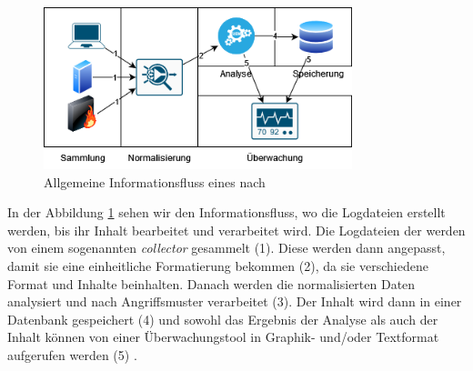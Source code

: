 \begin{figure}[H]
   \centering
   \includegraphics[width=0.8\textwidth]{assets/InfoFluss_SIEM.png}
   \caption[Allgemeine Informationsfluss von \gls{SIEM}]
   {Allgemeine Informationsfluss eines nach \cite{Granadillo_SIEM} }
   \label{fig:SIEM_Allg_Informationsfluss}
   \centering
\end{figure}



In der Abbildung \ref{fig:SIEM_Allg_Informationsfluss} sehen wir den Informationsfluss, wo die Logdateien erstellt werden, bis ihr Inhalt bearbeitet und verarbeitet wird. Die Logdateien der  werden von einem sogenannten \textit{collector} gesammelt (1). Diese werden dann angepasst, damit sie eine einheitliche Formatierung bekommen (2), da sie verschiedene Format und Inhalte beinhalten. Danach werden die normalisierten Daten analysiert und nach Angriffsmuster verarbeitet (3). Der Inhalt wird dann in einer Datenbank gespeichert (4) und sowohl das Ergebnis der Analyse als auch der Inhalt können von einer Überwachungstool in Graphik- und/oder Textformat aufgerufen werden (5) \cite{Granadillo_SIEM}. 





